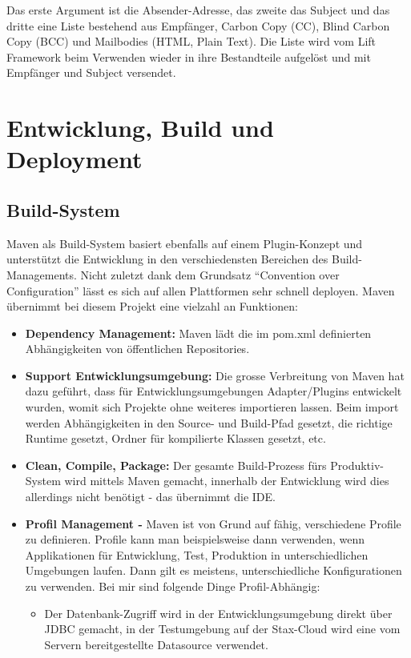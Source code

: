 Das erste Argument ist die Absender-Adresse, das zweite das Subject und das dritte eine Liste bestehend aus Empf\"anger, Carbon Copy (CC), Blind Carbon Copy (BCC) und Mailbodies (HTML, Plain Text). Die Liste wird vom Lift Framework beim Verwenden wieder in ihre Bestandteile aufgel\"ost und mit Empf\"anger und Subject versendet. 

\chapter{Entwicklung, Build und Deployment}\label{entwicklung-build-deployment}

\section{Build-System}Maven als Build-System basiert ebenfalls auf einem Plugin-Konzept und unterst\"utzt die Entwicklung in den verschiedensten Bereichen des Build-Managements. Nicht zuletzt dank dem Grundsatz ``Convention over Configuration'' l\"asst es sich auf allen Plattformen sehr schnell deployen. Maven \"ubernimmt bei diesem Projekt eine vielzahl an Funktionen:

\begin{itemize}
\item \textbf{Dependency Management: } Maven l\"adt die im pom.xml definierten Abh\"angigkeiten von \"offentlichen Repositories. 
\item \textbf{Support Entwicklungsumgebung:  } Die grosse Verbreitung von Maven hat dazu gef\"uhrt, dass f\"ur Entwicklungsumgebungen Adapter/Plugins entwickelt wurden, womit sich Projekte ohne weiteres importieren lassen. Beim import werden Abh\"angigkeiten in den Source- und Build-Pfad gesetzt, die richtige Runtime gesetzt, Ordner f\"ur kompilierte Klassen gesetzt, etc. 
\item \textbf{Clean, Compile, Package: }Der gesamte Build-Prozess f\"urs Produktiv-System wird mittels Maven gemacht, innerhalb der Entwicklung wird dies allerdings nicht ben\"otigt - das \"ubernimmt die IDE.
\item \textbf{Profil Management - } Maven ist von Grund auf f\"ahig, verschiedene Profile zu definieren. Profile kann man beispielsweise dann verwenden, wenn Applikationen f\"ur Entwicklung, Test, Produktion in unterschiedlichen Umgebungen laufen. Dann gilt es meistens, unterschiedliche Konfigurationen zu verwenden. Bei mir sind folgende Dinge Profil-Abh\"angig:\begin{itemize}
\item Der Datenbank-Zugriff wird in der Entwicklungsumgebung direkt \"uber JDBC gemacht, in der Testumgebung auf der Stax-Cloud wird eine vom Servern bereitgestellte Datasource verwendet.
\end{itemize}
\end{itemize}
